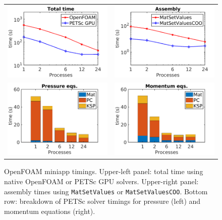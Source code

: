 \documentclass[5p,times]{elsarticle}
\begin{document}
\begin{figure}[htbp]
\begin{center}
\begingroup
\setlength{\tabcolsep}{0pt}
\begin{tabular}{c c}
\includegraphics[width=.5\linewidth]{figures/openfoam_total.png} & \includegraphics[width=.5\linewidth]{figures/openfoam_assembly.png}\\
\includegraphics[width=.5\linewidth]{figures/openfoam_P.png}     & \includegraphics[width=.5\linewidth]{figures/openfoam_U.png}
\end{tabular}
\endgroup
\caption{OpenFOAM miniapp timings. Upper-left panel: total time using native OpenFOAM or PETSc GPU solvers. Upper-right panel: assembly times using {\tt MatSetValues} or {\tt MatSetValuesCOO}. Bottom row: breakdown of PETSc solver timings for pressure (left) and momentum equations (right). }
\label{fig:foam_coo}
\end{center}
\end{figure}
\end{document}
